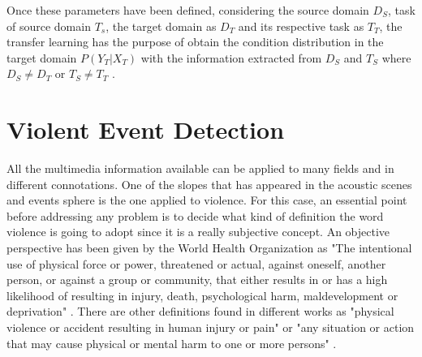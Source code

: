 	Once these parameters have been defined, considering the source domain $D_S$, task of source domain $T_s$, the target domain as $D_T$ and its respective task as $T_T$, the transfer learning has the purpose of obtain the condition distribution in the target domain $P(Y_T|X_T)$ with the information extracted from $D_S$ and $T_S$ where $D_S \neq D_T$ or $T_S \neq T_T$ \cite{Ruder2017}.
	
\section{Violent Event Detection}

	All the multimedia information available can be applied to many fields and in different connotations. One of the slopes that has appeared in the acoustic scenes and events sphere is the one applied to violence. For this case, an essential point before addressing any problem is to decide what kind of definition the word violence is going to adopt since it is a really subjective concept. An objective perspective has been given by the World Health Organization as "The  intentional  use  of physical  force  or  power,  threatened  or  actual,  against oneself, another person, or against a group or community, that either results in or has a high likelihood of resulting in injury,  death,  psychological  harm,  maldevelopment  or deprivation" \cite{Krug2002}. There are other definitions found in different works as "physical violence or accident resulting in human injury or pain" \cite{Demarty2013} or "any situation or action that may cause physical or mental harm to one or more persons" \cite{Giannakopoulos2006}.
	
